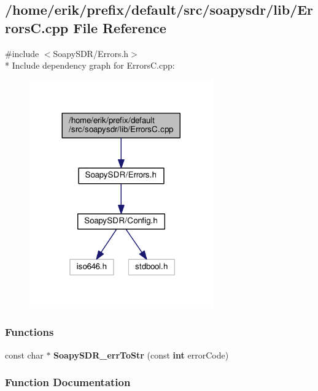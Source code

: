 \subsection{/home/erik/prefix/default/src/soapysdr/lib/\+ErrorsC.cpp File Reference}
\label{ErrorsC_8cpp}
{\ttfamily \#include $<$Soapy\+S\+D\+R/\+Errors.\+h$>$}\\*
Include dependency graph for Errors\+C.\+cpp\+:
\nopagebreak
\begin{figure}[H]
\begin{center}
\leavevmode
\includegraphics[width=224pt]{d8/d08/ErrorsC_8cpp__incl}
\end{center}
\end{figure}
\subsubsection*{Functions}
\begin{DoxyCompactItemize}
\item 
const char $\ast$ {\bf Soapy\+S\+D\+R\+\_\+err\+To\+Str} (const {\bf int} error\+Code)
\end{DoxyCompactItemize}


\subsubsection{Function Documentation}
